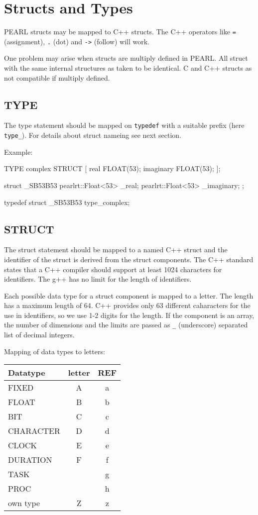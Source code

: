 \chapter{Structs and Types}

PEARL structs may be mapped to C++ structs.
The C++ operators like \verb|=| (assignment), \verb|.| (dot) and 
\verb|->| (follow) will work.

One problem may arise when structs are multiply defined
in PEARL. All struct with the same internal structures as
taken to be identical. C and C++ structs as not compatible
if multiply defined.

\section{TYPE}
The type statement should be mapped on \verb|typedef| with a suitable prefix 
(here \verb|type_|). For details about struct nameing see next section.

Example:
\begin{PEARLCode}
TYPE complex STRUCT [
     real FLOAT(53);
     imaginary FLOAT(53);
];
\end{PEARLCode}

\begin{CppCode}
struct _SB53B53 {
   pearlrt::Float<53> _real;
   pearlrt::Float<53> _imaginary;
};

typedef struct _SB53B53 type_complex; 
\end{CppCode}

\section{STRUCT}
The struct statement should be mapped to a named C++ struct and the identifier
of the struct is derived from the struct components.
The C++ standard states that a C++ compiler should support at least 1024
characters for identifiers. The g++ has no limit for the length of identifiers.

Each possible data type for a struct component is mapped to a letter.
The length has a maximum length of 64. C++ provides only 63 different caharacters for the use in identifiers, so we use 1-2 digits for the length.
If the component is an array, the number of dimensions and the limits are
passed as \verb|_| (underscore) separated list of decimal integers.

Mapping of data types to letters:

\begin{tabular}{|l|c|c|}
\hline
Datatype & letter & REF \\
\hline
FIXED & A &a\\
FLOAT & B &b\\
BIT  & C &c\\
CHARACTER & D &d \\
CLOCK  & E &e \\
DURATION & F&f \\
TASK & & g \\
PROC  & & h \\
\hline
own type & Z &z\\
\hline
\end{tabular}

